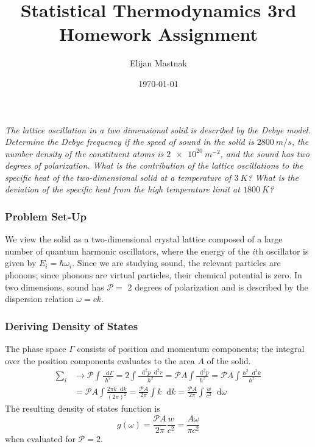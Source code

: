 \documentclass[11pt, a4paper]{article}
\newcommand*\diff{\mathop{}\!\mathrm{d}} %
\begin{document}
	\title{Statistical Thermodynamics 3rd Homework Assignment}
	\author{Elijan Mastnak}
	\date{\today}
	\maketitle
	
\textit{The lattice oscillation in a two dimensional solid is described by the Debye model. Determine the Debye frequency if the speed of sound in the solid is $ \SI{2800}{m/s} $, the number density of the constituent atoms is $ \SI{2e20}{m^{-2}} $, and the sound has two degrees of polarization. What is the contribution of the lattice oscillations to the specific heat of the two-dimensional solid at a temperature of $ \SI{3}{K} $? What is the deviation of the specific heat from the high temperature limit at $ \SI{1800}{K} $?}

\subsubsection*{Problem Set-Up}
We view the solid as a two-dimensional crystal lattice composed of a large number of quantum harmonic oscillators, where the energy of the $ i $th oscillator is given by $ E_i = \hbar \omega_i $. Since we are studying sound, the relevant particles are phonons; since phonons are virtual particles, their chemical potential is zero. In two dimensions, sound has $ \mathcal{P} = $ 2 degrees of polarization and is described by the dispersion relation $ \omega = ck $.

\subsubsection*{Deriving Density of States}
The phase space $ \Gamma $ consists of position and momentum components; the integral over the position components evaluates to the area $ A $ of the solid.
\begin{align*}
	\sum_{i} &\to \mathcal{P} \int \frac{\diff \Gamma}{h^2} = 2 \int \frac{\diff^2 p \diff^2 r}{h^2} = \mathcal{P} A \int \frac{\diff^2 p}{h^2} = \mathcal{P} A \int \frac{\hbar^2 \diff^2 k}{h^2} \\[1.0ex]
	&= \mathcal{P} A \int \frac{2\pi k \diff k}{(2\pi)^2} = \frac{ \mathcal{P} A }{2\pi}\int  k \diff k = \frac{ \mathcal{P} A }{2\pi}\int  \frac{w}{c^2} \diff \omega
\end{align*}
The resulting density of states function is 
\begin{equation*}
	g(\omega) = \frac{ \mathcal{P} A }{2\pi}  \frac{w}{c^2} = \frac{ A \omega }{\pi c^2} 
\end{equation*}
when evaluated for $ \mathcal{P} = 2 $. 
\end{document}
